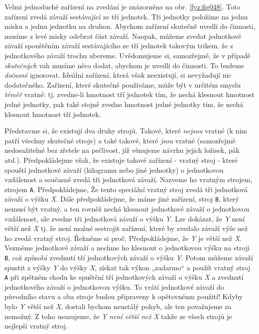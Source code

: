     Velmi jednoduché zařízení na zvedání je znázorněno na obr. \ref{fyz:fig048}. Toto zařízení 
    zvedá závaží sestávající ze tří jednotek. Tři jednotky položíme na jednu misku a jednu jednotku 
    na druhou. Abychom zařízení skutečně uvedli do činnosti, musíme z levé misky odebrat část 
    závaží. Naopak, můžeme zvedat jednotkové závaží spouštěním závaží sestávajícího ze tří jednotek 
    takovým trikem, že z jednotkového závaží trochu ubereme. Uvědomujeme si, samozřejmě, že v 
    případě \emph{skutečných} vah musíme něco dodat, abychom je uvedli do činnosti. To budeme 
    \emph{dočasné} ignorovat. Ideální zařízení, která však neexistují, si nevyžadují nic 
    dodatečného. Zařízení, které skutečně používáme, může být v určitém smyslu \emph{téměř} vratné: 
    tj. zvedne-li hmotnost tří jednotek tím, že nechá klesnout hmotnost jedné jednotky, pak také 
    stejně zvedne hmotnost jedné jednotky tím, že nechá klesnout hmotnost tří jednotek.
    
    Představme si, že existují dva druhy strojů. Takové, které \emph{nejsou} vratné (k nim patří 
    všechny skutečné stroje) a také takové, které \emph{jsou} vratné (samozřejmě nedosažitelné bez 
    zřetele na pečlivost, jíž věnujeme návrhu jejich ložisek, pák atd.). Předpokládejme však, že 
    existuje takové zařízení - vratný stroj - které spouští jednotkové závaží (kilogramu nebo jiné 
    jednotky) o jednotkovou vzdálenost a současně zvedá tři jednotková závaží. Nazveme ho vratným 
    strojem, strojem \texttt{A}. Předpokládejme, Že tento speciální vratný stroj zvedá tři 
    jednotková závaží o výšku \emph{X}. Dále předpokládejme, že máme jiné zařízení, stroj 
    \texttt{B}, který nemusí být vratný, a ten rovněž nechá klesnout jednotkové závaží o 
    jednotkovou vzdálenost, ale zvedne tři jednotková závaží o výšku \emph{Y}. Lze dokázat, že 
    \emph{Y} není větší než \emph{X} tj. že není možné sestrojit zařízení, které by zvedalo závaží 
    výše než ho zvedá vratný stroj. Řekněme si proč. Předpokládejme, že \emph{Y} je větší než 
    \emph{X}. Vezměme jednotkové závaží a nechme ho klesnout o jednotkovou výšku na stroji 
    \texttt{B}, což způsobí zvednutí tří jednotkových závaží o výšku \emph{Y}. Potom můžeme závaží 
    spustit z výšky \emph{Y} do výšky \emph{X}, získat tak výkon „zadarmo“ a použít vratný stroj 
    \texttt{A} při zpětném chodu ke spuštění tří jednotkových závaží o výšku \emph{X} a zvednutí 
    jednotkového závaží o jednotkovou výšku. To vrátí jednotkové závaží do původního stavu a oba 
    stroje budou připraveny k opětovnému použití! Kdyby bylo \emph{Y} větší než \emph{X}, dostali 
    bychom neustálý pohyb, ale ten považujeme za nemožný. Z toho usuzujeme, že \emph{Y} \emph{není 
    větší než} \emph{X} takže ze všech strojů je nejlepší vratný stroj.
    
